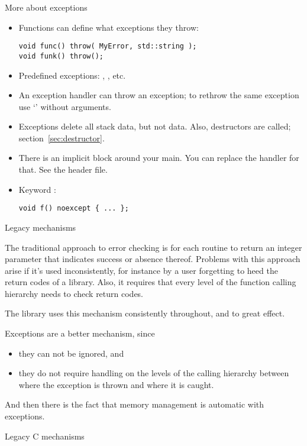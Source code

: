 \begin{block}{More about exceptions}
  \label{sl:exception-more}
  \begin{itemize}
  \item Functions can define what exceptions they throw: 
\begin{verbatim}
void func() throw( MyError, std::string );
void funk() throw();
\end{verbatim}
\item Predefined exceptions: ,
  , etc.
\item An exception handler can throw an exception; to rethrow the same
  exception use `' without arguments.
\item Exceptions delete all stack data, but not  data. Also,
  destructors are called; section~\ref{sec:destructor}.
\item There is an implicit  block around your
  main. You can replace the handler for that. See the
   header file.
\item Keyword :
\begin{verbatim}
void f() noexcept { ... };
\end{verbatim}
  \end{itemize}
\end{block}

 {Legacy mechanisms}

The traditional approach to error checking is for each routine to
return an integer parameter that indicates success or absence
thereof. 
Problems with this approach arise if it's used inconsistently, for
instance by a user forgetting to heed the return codes of a library.
Also, it requires that every level of the function calling hierarchy
needs to check return codes.

The  library uses this mechanism
consistently throughout, and to great effect.

Exceptions are a better mechanism, since
\begin{itemize}
\item they can not be ignored, and
\item they do not require handling on the levels of the calling
  hierarchy between where the exception is thrown and where it is caught.
\end{itemize}
And then there is the fact that memory management is automatic with
exceptions.

 {Legacy C mechanisms}

